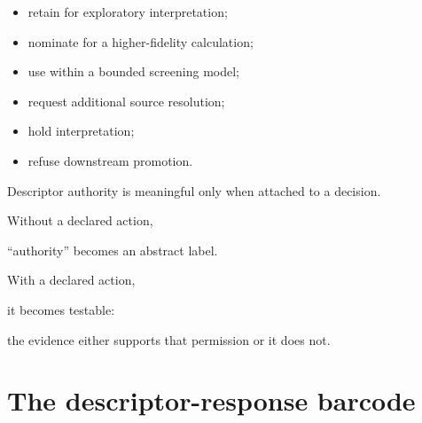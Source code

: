 \documentclass[11pt,a4paper,oneside]{report}
\begin{document}
\begin{itemize}



\item

retain for exploratory interpretation;



\item

nominate for a higher-fidelity calculation;



\item

use within a bounded screening model;



\item

request additional source resolution;



\item

hold interpretation;



\item

refuse downstream promotion.



\end{itemize}





\begin{engineeringconsequence}



Descriptor authority is meaningful only when attached to a decision.



Without a declared action,

``authority'' becomes an abstract label.



With a declared action,

it becomes testable:

the evidence either supports that permission or it does not.



\end{engineeringconsequence}





\section{The descriptor-response barcode}
\end{document}
